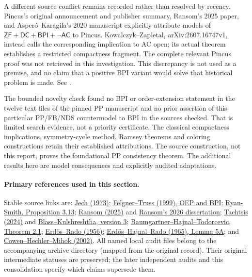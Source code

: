 A different source conflict remains recorded rather than resolved by
recency. Pincus's original announcement and publisher summary, Ransom's
2025 paper, and Asper\'o--Karagila's 2020 manuscript explicitly attribute
models of $\mathsf{ZF}+\mathsf{DC}+\mathsf{BPI}+\neg\mathsf{AC}$ to
Pincus. Kowalczyk--Zapletal, arXiv:2607.16747v1, instead calls the
corresponding implication to AC open; its actual theorem establishes
a restricted compactness fragment. The complete relevant Pincus proof
was not retrieved in this investigation. This discrepancy is not used
as a premise, and no claim that a positive BPI variant would solve
that historical problem is made. See
.

The bounded novelty check found no BPI or order-extension statement in
the twelve text files of the pinned PP manuscript and no prior assertion
of this particular PP/FB/NDS countermodel to BPI in the sources checked.
That is limited search evidence, not a priority certificate. The
classical compactness implications, symmetry-cycle method, Ramsey
theorems and coloring constructions retain their established
attributions. The source construction, not this report, proves the
foundational PP consistency theorem. The additional results here are
model consequences and explicitly audited adaptations.

\paragraph{Primary references used in this section.}
Stable source links are:
\href{https://gwern.net/doc/math/1973-jech-theaxiomofchoice.pdf}{Jech (1973)};
\href{https://doi.org/10.2307/2586759}{Felgner--Truss (1999), OEP and BPI};
\href{https://academic.calliope.mx/files/papers/2412.13785.pdf}{Ryan-Smith, Proposition 3.13};
\href{https://arxiv.org/abs/2511.21684v1}{Ransom (2025)} and
\href{https://escholarship.org/uc/item/0b35t7sd}{Ransom's 2026 dissertation};
\href{https://doi.org/10.1215/00294527-2024-0020}{Tachtsis (2024)} and
\href{https://arxiv.org/abs/2310.09643v3}{Blass--Kulshreshtha, version 3};
\href{https://arxiv.org/pdf/math/9311207}{Baumgartner--Hajnal--Todorcevic,
Theorem 2.1};
\href{https://www.renyi.hu/~p_erdos/1956-02.pdf}{Erd\H{o}s--Rado (1956)};
\href{https://users.renyi.hu/~p_erdos/1965-14.pdf}{Erd\H{o}s--Hajnal--Rado
(1965), Lemma 5A}; and
\href{https://www.jams.jp/notice/scmj/56-2.html}{Cowen--Hechler--Mihok (2002)}.
All named local audit files belong to the accompanying
 archive directory (mapped from the original  record). Their original
intermediate statuses are preserved; the later independent audits and
this consolidation specify which claims supersede them.
